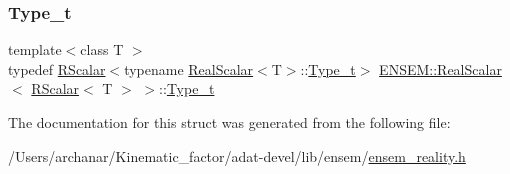 \subsubsection{\texorpdfstring{Type\_t}{Type\_t}\hspace{0.1cm}{\footnotesize\ttfamily [3/3]}}
{\footnotesize\ttfamily template$<$class T $>$ \\
typedef \mbox{\hyperlink{classENSEM_1_1RScalar}{R\+Scalar}}$<$typename \mbox{\hyperlink{structENSEM_1_1RealScalar}{Real\+Scalar}}$<$T$>$\+::\mbox{\hyperlink{structENSEM_1_1RealScalar_3_01RScalar_3_01T_01_4_01_4_a98fef60a69ef8b4856721a6f7b115ce5}{Type\+\_\+t}}$>$ \mbox{\hyperlink{structENSEM_1_1RealScalar}{E\+N\+S\+E\+M\+::\+Real\+Scalar}}$<$ \mbox{\hyperlink{classENSEM_1_1RScalar}{R\+Scalar}}$<$ T $>$ $>$\+::\mbox{\hyperlink{structENSEM_1_1RealScalar_3_01RScalar_3_01T_01_4_01_4_a98fef60a69ef8b4856721a6f7b115ce5}{Type\+\_\+t}}}



The documentation for this struct was generated from the following file\+:\begin{DoxyCompactItemize}
\item 
/\+Users/archanar/\+Kinematic\+\_\+factor/adat-\/devel/lib/ensem/\mbox{\hyperlink{adat-devel_2lib_2ensem_2ensem__reality_8h}{ensem\+\_\+reality.\+h}}\end{DoxyCompactItemize}
